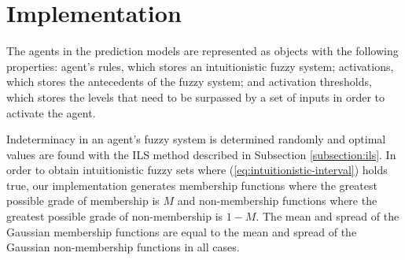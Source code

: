 \documentclass{ieeeaccess}
\begin{document}
\section{Implementation}
\label{section:implementation}

The agents in the prediction models are represented as objects with
the following properties: agent's rules, which stores an
intuitionistic fuzzy system; activations, which stores the antecedents
of the fuzzy system; and activation thresholds, which stores the
levels that need to be surpassed by a set of inputs in order to
activate the agent.

Indeterminacy in an agent's fuzzy system is determined randomly and
optimal values are found with the ILS method described in
Subsection \ref{subsection:ils}. In order to obtain
intuitionistic fuzzy sets where (\ref{eq:intuitionistic-interval}) holds
true, our implementation generates membership functions where the
greatest possible grade of membership is $M$ and non-membership
functions where the greatest possible grade of non-membership is $1 -
M$. The mean and spread of the Gaussian membership functions are
equal to the mean and spread of the Gaussian non-membership functions
in all cases.
\end{document}
